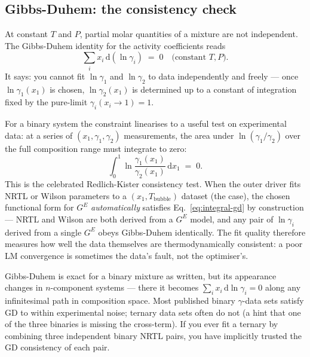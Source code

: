 \documentclass[11pt,a4paper]{article}
\begin{document}
\subsection{Gibbs-Duhem: the consistency check}

At constant $T$ and $P$, partial molar quantities of a mixture are
not independent.  The Gibbs-Duhem identity for the activity
coefficients reads
\begin{equation}
   \boxed{\;
   \sum_i x_i\,\mathrm{d}(\ln \gamma_i) \;=\; 0
   \quad\text{(constant $T, P$).}
   \;}
   \label{eq:integral-gd}
\end{equation}
It says: you cannot fit $\ln \gamma_1$ and $\ln \gamma_2$ to data
independently and freely --- once $\ln \gamma_1(x_1)$ is chosen,
$\ln \gamma_2(x_1)$ is determined up to a constant of integration
fixed by the pure-limit $\gamma_i(x_i \to 1) = 1$.

For a binary system the constraint linearises to a useful test on
experimental data: at a series of $(x_1, \gamma_1, \gamma_2)$
measurements, the area under $\ln(\gamma_1/\gamma_2)$ over the full
composition range must integrate to zero:
\begin{equation}
   \int_0^1 \ln\frac{\gamma_1(x_1)}{\gamma_2(x_1)}\,\mathrm{d}x_1
   \;=\; 0.
   \label{eq:integral-gd-area}
\end{equation}
This is the celebrated Redlich-Kister consistency test.  When the
 outer driver fits NRTL or Wilson parameters to a
$(x_1, T_{\mathrm{bubble}})$ dataset (the
 case), the chosen
functional form for $G^E$ \emph{automatically} satisfies
Eq.~\eqref{eq:integral-gd} by construction --- NRTL and Wilson are
both derived from a $G^E$ model, and any pair of $\ln \gamma_i$
derived from a single $G^E$ obeys Gibbs-Duhem identically.  The fit
quality therefore measures how well the data themselves are
thermodynamically consistent: a poor LM convergence is sometimes the
data's fault, not the optimiser's.

\begin{pitfall}
Gibbs-Duhem is exact for a binary mixture as written, but its
appearance changes in $n$-component systems --- there it becomes
$\sum_i x_i\,\mathrm{d} \ln \gamma_i = 0$ along any
infinitesimal path in composition space.  Most published binary
$\gamma$-data sets satisfy GD to within experimental noise;
ternary data sets often do not (a hint that one of the three
binaries is missing the cross-term).  If you ever fit a ternary by
combining three independent binary NRTL pairs, you have implicitly
trusted the GD consistency of each pair.
\end{pitfall}
\end{document}
